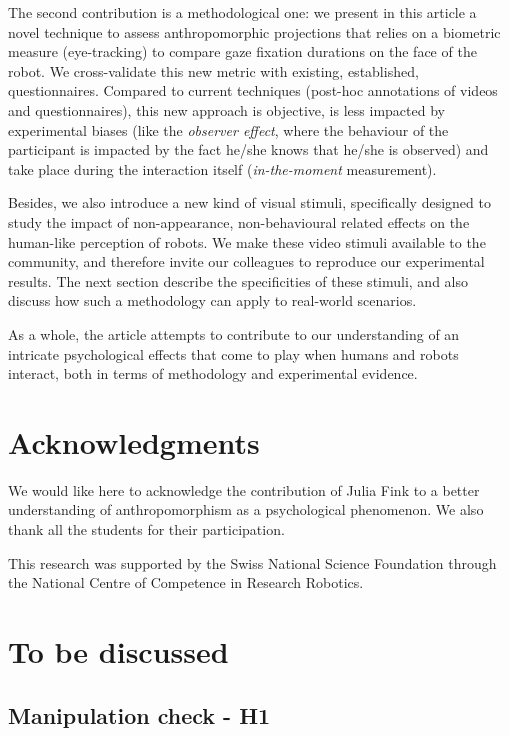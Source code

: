 \documentclass[lettersize, noapacite, twoside, HRI]{apa_HRI}
\begin{document}
The second contribution is a methodological one: we present in this article
a novel technique to assess anthropomorphic projections that relies on a
biometric measure (eye-tracking) to compare gaze fixation durations on
the face of the robot. We cross-validate this new metric with existing,
established, questionnaires. Compared to current techniques (post-hoc
annotations of videos and questionnaires), this new approach is objective,
is less impacted by experimental biases (like the \emph{observer effect},
where the behaviour of the participant is impacted by the fact he/she knows that
he/she is observed) and take place during the interaction itself
(\emph{in-the-moment} measurement).

Besides, we also introduce a new kind of visual stimuli, specifically designed
to study the impact of non-appearance, non-behavioural related effects on the
human-like perception of robots. We make these video stimuli available to the
community, and therefore invite our colleagues to reproduce our experimental
results. The next section describe the specificities of these stimuli, and also
discuss how such a methodology can apply to real-world scenarios.

As a whole, the article attempts to contribute to our understanding of an
intricate psychological effects that come to play when humans and robots
interact, both in terms of methodology and experimental evidence.


\section*{Acknowledgments}

We would like here to acknowledge the contribution of Julia Fink to a better
understanding of anthropomorphism as a psychological phenomenon. We also thank
all the students for their participation.

This research was supported by the Swiss National Science Foundation through the
National Centre of Competence in Research Robotics.

\newpage


\section {To be discussed}


\subsection{Manipulation check - H1}
\end{document}
